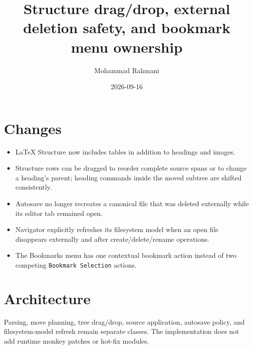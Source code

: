 \documentclass[a4paper]{article}
\title{Structure drag/drop, external deletion safety, and bookmark menu ownership}
\date{2026-09-16}
\author{Mohammad Rahmani}
\begin{document}
   \maketitle

   \begin{preview}
      \section{Changes}
      \begin{itemize}
         \item LaTeX Structure now includes tables in addition to headings and images.
         \item Structure rows can be dragged to reorder complete source spans or to change a heading's parent; heading commands inside the moved subtree are shifted consistently.
         \item Autosave no longer recreates a canonical file that was deleted externally while its editor tab remained open.
         \item Navigator explicitly refreshes its filesystem model when an open file disappears externally and after create/delete/rename operations.
         \item The Bookmarks menu has one contextual bookmark action instead of two competing \texttt{Bookmark Selection} actions.
      \end{itemize}

      \section{Architecture}
      Parsing, move planning, tree drag/drop, source application, autosave policy, and filesystem-model refresh remain separate classes. The implementation does not add runtime monkey patches or hot-fix modules.
   \end{preview}

   
   
\end{document}
